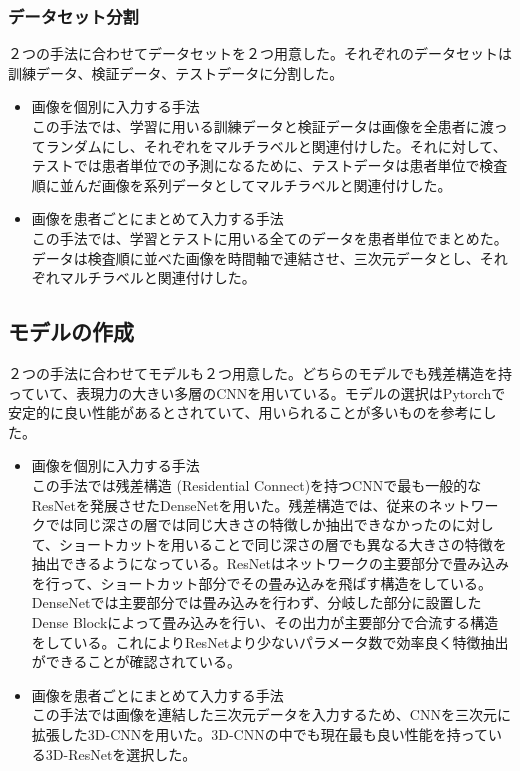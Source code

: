\subsubsection{データセット分割}
２つの手法に合わせてデータセットを２つ用意した。それぞれのデータセットは訓練データ、検証データ、テストデータに分割した。
\begin{itemize}
    \item 画像を個別に入力する手法\\
この手法では、学習に用いる訓練データと検証データは画像を全患者に渡ってランダムにし、それぞれをマルチラベルと関連付けした。それに対して、テストでは患者単位での予測になるために、テストデータは患者単位で検査順に並んだ画像を系列データとしてマルチラベルと関連付けした。
    \item 画像を患者ごとにまとめて入力する手法\\
この手法では、学習とテストに用いる全てのデータを患者単位でまとめた。データは検査順に並べた画像を時間軸で連結させ、三次元データとし、それぞれマルチラベルと関連付けした。
\end{itemize}
\subsection{モデルの作成}
２つの手法に合わせてモデルも２つ用意した。どちらのモデルでも残差構造を持っていて、表現力の大きい多層のCNNを用いている。モデルの選択はPytorchで安定的に良い性能があるとされていて、用いられることが多いものを参考にした。
\begin{itemize}
    \item 画像を個別に入力する手法\\
この手法では残差構造 (Residential Connect)を持つCNN\cite{CNN}で最も一般的なResNet\cite{ResNet}を発展させたDenseNet\cite{DenseNet}を用いた。残差構造では、従来のネットワークでは同じ深さの層では同じ大きさの特徴しか抽出できなかったのに対して、ショートカットを用いることで同じ深さの層でも異なる大きさの特徴を抽出できるようになっている。ResNetはネットワークの主要部分で畳み込みを行って、ショートカット部分でその畳み込みを飛ばす構造をしている。DenseNetでは主要部分では畳み込みを行わず、分岐した部分に設置したDense Blockによって畳み込みを行い、その出力が主要部分で合流する構造をしている。これによりResNetより少ないパラメータ数で効率良く特徴抽出ができることが確認されている。
    \item 画像を患者ごとにまとめて入力する手法\\
この手法では画像を連結した三次元データを入力するため、CNNを三次元に拡張した3D-CNNを用いた。3D-CNNの中でも現在最も良い性能を持っている3D-ResNet\cite{3D_ResNet}を選択した。
\end{itemize}
